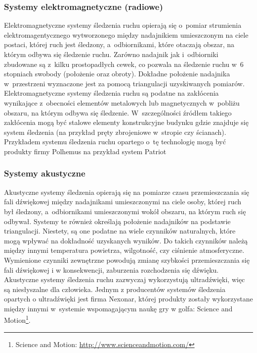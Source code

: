 \subsubsection*{Systemy elektromagnetyczne (radiowe)}
Elektromagnetyczne systemy śledzenia ruchu opierają się o~pomiar strumienia elektromagentycznego wytworzonego między nadajnikiem umieszczonym na ciele postaci, której ruch jest śledzony, a~odbiornikami, które otaczają obszar, na którym odbywa się śledzenie ruchu. Zarówno nadajnik jak i~odbiorniki zbudowane są z~kilku prostopadłych cewek, co pozwala na śledzenie ruchu w~6 stopniach swobody (położenie oraz obroty). Dokładne położenie nadajnika w~przestrzeni wyznaczone jest za pomocą triangulacji uzyskiwanych pomiarów. Elektromagnetyczne systemy śledzenia ruchu są podatne na zakłócenia wynikające z~obecności elementów metalowych lub magnetycznych w~pobliżu obszaru, na którym odbywa się śledzenie. W~szczególności źródłem  takiego zakłócenia mogą być stalowe elementy konstrukcyjne budynku gdzie znajduje się system śledzenia (na przykład pręty zbrojeniowe w~stropie czy ścianach). Przykładem systemu śledzenia ruchu opartego o~tę technologię mogą być produkty firmy Polhemus na przykład system Patriot
									
\subsubsection*{Systemy akustyczne}
Akustyczne systemy śledzenia opierają się na pomiarze czasu przemieszczania się fali dźwiękowej między nadajnikami umieszczonymi na ciele osoby, której ruch był śledzony, a~odbiornikami umieszczonymi wokół obszaru, na którym ruch się odbywał. Systemy te również określają położenie nadajników na podstawie triangulacji. Niestety, są one podatne na wiele czynników naturalnych, które mogą wpływać na dokładność uzyskanych wyników. Do takich czynników należą między innymi temperatura powietrza, wilgotność, czy ciśnienie atmosferyczne. Wymienione czynniki zewnętrzne powodują zmianę szybkości przemieszczania się fali dźwiękowej i w konsekwencji, zaburzenia rozchodzenia się dźwięku. Akustyczne systemy śledzenia ruchu zazwyczaj wykorzystują ultradźwięki, więc są niesłyszalne dla człowieka. Jednym z producentów systemów śledzenia opartych o ultradźwięki jest firma Nexonar, której produkty zostały wykorzystane między innymi w~systemie wspomagającym naukę gry w golfa: Science and Motion\footnote{Science and Motion: \url{http://www.scienceandmotion.com/}}.
									
